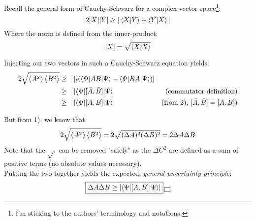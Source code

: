 \documentclass[solutions.tex]{subfiles}
\begin{document}
Recall the general form of Cauchy-Schwarz for a complex vector
space\footnote{I'm sticking to the authors' terminology and notations.}:
\[
	2|X||Y| \geq |\left\langle X \middle| Y \right\rangle + \left\langle Y \middle| X \right\rangle|
\]
Where the norm is defined from the inner-product:
\[
	|X| = \sqrt{\left\langle X \middle| X \right\rangle}
\]

Injecting our two vectors in such a Cauchy-Schwarz equation yields:
\begin{equation*}\begin{aligned}
	2\sqrt{\left\langle \bar{A}^2 \right\rangle\left\langle \bar{B}^2 \right\rangle} &\geq&&
		|i(\langle \Psi|\bar{A}\bar{B}|\Psi\rangle-\langle \Psi|\bar{B}\bar{A}|\Psi\rangle)|
			& ~ \\
	~ &\geq&&
		|\langle \Psi|[\bar{A},\bar{B}]|\Psi\rangle|
			& \text{(commutator definition)} \\
	~ &\geq&&
		|\langle \Psi|[A,B]|\Psi\rangle| &
			(\text{from 2), }[\bar{A},\bar{B}] = [A, B]) \\
\end{aligned}\end{equation*}

But from 1), we know that
\[
	2\sqrt{\left\langle \bar{A}^2 \right\rangle\left\langle \bar{B}^2 \right\rangle} = 2\sqrt{(\Delta A)^2(\Delta B)^2}
		=  2\Delta A\Delta B
\]
Note that the $\sqrt{.}$ can be removed "safely" as the $\Delta C^2$ are
defined as a sum of positive terms (no absolute values necessary). \\

Putting the two together yields the expected, \textit{general uncertainty principle}:
\[
	\boxed{
		\Delta A\Delta B \geq |\langle \Psi|[A,B]|\Psi\rangle|
	} \,\boxed{\,}
\]
\end{document}
